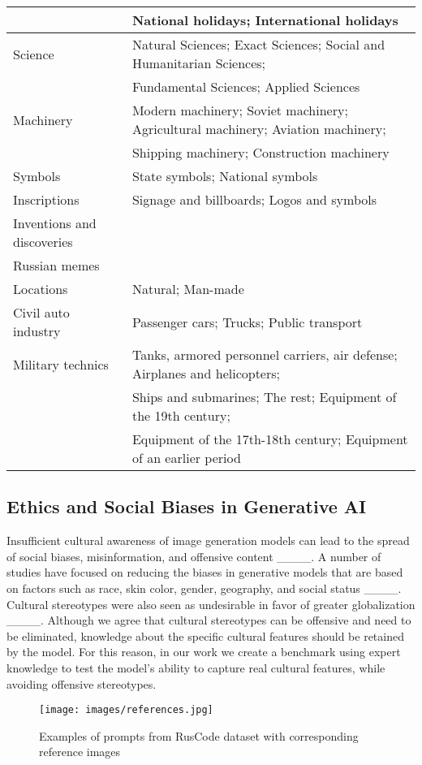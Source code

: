 \begin{table*}[!t]
\begin{tabular}{ll}
    & National holidays; International holidays\\
    \hline
    Science & Natural Sciences; Exact Sciences; Social and Humanitarian Sciences;\\
    & Fundamental Sciences; Applied Sciences\\
    \hline
    Machinery & Modern machinery; Soviet machinery; Agricultural machinery; Aviation machinery;\\
    & Shipping machinery; Construction machinery\\
    \hline
    Symbols & State symbols; National symbols\\
    \hline
    Inscriptions & Signage and billboards; Logos and symbols\\
    \hline
    Inventions and discoveries & \\
    \hline
    Russian memes & \\
    \hline
    Locations & Natural; Man-made\\
    \hline
    Civil auto industry & Passenger cars; Trucks; Public transport\\
    \hline
    Military technics & Tanks, armored personnel carriers, air defense; Airplanes and helicopters;\\
    & Ships and submarines; The rest; Equipment of the 19th century;\\
    & Equipment of the 17th-18th century; Equipment of an earlier period\\
    \hline
\end{tabular}
\label{tab:categories}
\end{table*}

\subsection{Ethics and Social Biases in Generative AI}

Insufficient cultural awareness of image generation models can lead to the spread of social biases, misinformation, and offensive content ____. A number of studies have focused on reducing the biases in generative models that are based on factors such as race, skin color, gender, geography, and social status ____. Cultural stereotypes were also seen as undesirable in favor of greater globalization ____. Although we agree that cultural stereotypes can be offensive and need to be eliminated, knowledge about the specific cultural features should be retained by the model. For this reason, in our work we create a benchmark using expert knowledge to test the model's ability to capture real cultural features, while avoiding offensive stereotypes.

\begin{figure*}[t]
\centering
\texttt{[image: images/references.jpg]}
\caption{Examples of prompts from RusCode dataset with corresponding reference images}
\label{fig:references}
\end{figure*}